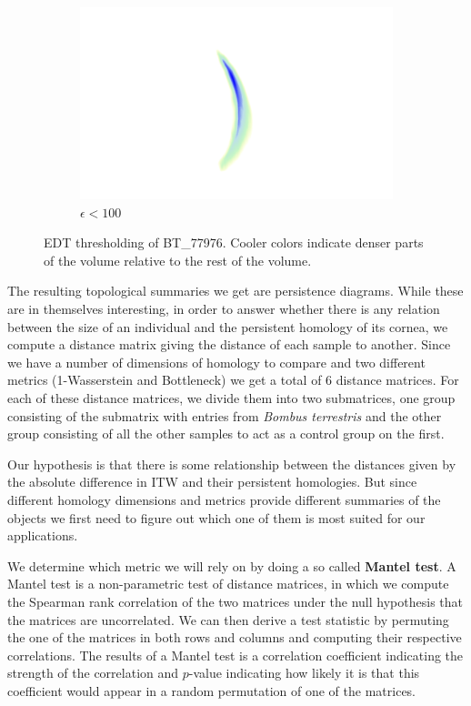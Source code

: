 \begin{figure}[ht]
\begin{subfigure}{.3 \linewidth}
  \includegraphics[scale=0.2]{eps100.png}
  \caption{$\epsilon < 100$}
  \end{subfigure}
  \caption{\label{thresh} EDT thresholding of BT\_77976. Cooler colors indicate denser parts of the volume relative to the rest of the volume.}
\end{figure}

The resulting topological summaries we get are persistence diagrams. While these are in themselves interesting, in order to answer whether there is any relation between the size of an individual and the persistent homology of its cornea, we compute a distance matrix giving the distance of each sample to another. Since we have a number of dimensions of homology to compare and two different metrics (1-Wasserstein and Bottleneck) we get a total of 6 distance matrices. For each of these distance matrices, we divide them into two submatrices, one group consisting of the submatrix with entries from \textit{Bombus terrestris} and the other group consisting of all the other samples to act as a control group on the first.

Our hypothesis is that there is some relationship between the distances given by the absolute difference in ITW and their persistent homologies. But since different homology dimensions and metrics provide different summaries of the objects we first need to figure out which one of them is most suited for our applications.

We determine which metric we will rely on by doing a so called \textbf{Mantel test}. A Mantel test is a non-parametric test of distance matrices, in which we compute the Spearman rank correlation of the two matrices under the null hypothesis that the matrices are uncorrelated. We can then derive a test statistic by permuting the one of the matrices in both rows and columns and computing their respective correlations.  The results of a Mantel test is a correlation coefficient indicating the strength of the correlation and $p$-value indicating how likely it is  that this coefficient would appear in a random permutation of one of the matrices.

